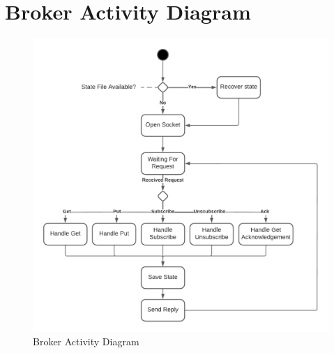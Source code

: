 \appendix
\onecolumn
\section{Broker Activity Diagram}

\begin{figure}[!h]
    \centering
    \includegraphics[width=\linewidth]{resources/Activity Diagram SDLE.png}
    \caption{Broker Activity Diagram}
    \label{fig:activity-diagram}
\end{figure}
